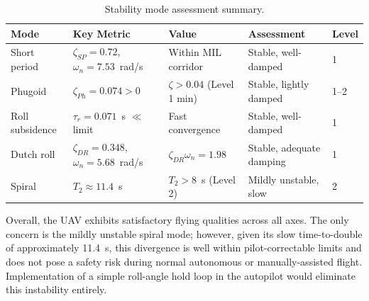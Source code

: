 \begin{table}[H]
  \centering
  \caption{Stability mode assessment summary.}
  \label{tab:assessment}
  \begin{tabular}{lllll}
    \toprule
    \textbf{Mode} & \textbf{Key Metric} & \textbf{Value} & \textbf{Assessment} & \textbf{Level} \\
    \midrule
    Short period  & $\zeta_{SP}=0.72$, $\omega_{n}=7.53$~rad/s
                  & Within MIL corridor & Stable, well-damped    & 1 \\
    Phugoid       & $\zeta_{Ph}=0.074 > 0$
                  & $\zeta > 0.04$ (Level 1 min) & Stable, lightly damped & 1--2 \\
    Roll subsidence & $\tau_r=0.071$~s $\ll$ limit
                  & Fast convergence   & Stable, well-damped     & 1 \\
    Dutch roll    & $\zeta_{DR}=0.348$, $\omega_{n}=5.68$~rad/s
                  & $\zeta_{DR}\omega_{n}=1.98$ & Stable, adequate damping & 1 \\
    Spiral        & $T_2 \approx 11.4$~s
                  & $T_2 > 8$~s (Level 2) & Mildly unstable, slow & 2 \\
    \bottomrule
  \end{tabular}
\end{table}

Overall, the UAV exhibits satisfactory flying qualities across all axes. The only concern is the mildly unstable spiral mode; however, given its slow time-to-double of approximately \SI{11.4}{s}, this divergence is well within pilot-correctable limits and does not pose a safety risk during normal autonomous or manually-assisted flight. Implementation of a simple roll-angle hold loop in the autopilot would eliminate this instability entirely.

